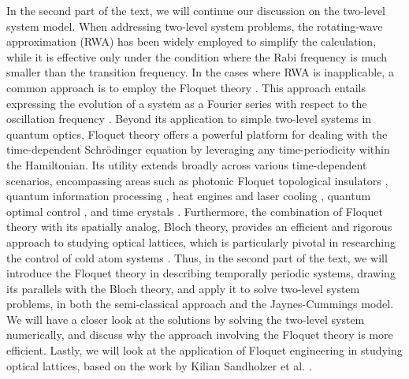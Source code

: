 \documentclass[reprint, amsmath, amssymb, aps]{revtex4-2}
\begin{document}
In the second part of the text, we will continue our discussion on the two-level system model.
When addressing two-level system problems, the rotating-wave approximation (RWA) has been widely employed to simplify the calculation, while it is effective only under the condition where the Rabi frequency is much smaller than the transition frequency. In the cases where RWA is inapplicable, a common approach is to employ the Floquet theory \cite{Shirley, Engelhardt, Wang}. This approach entails expressing the evolution of a system as a Fourier series with respect to the oscillation frequency \cite{Campaioli, Viebahn}. Beyond its application to simple two-level systems in quantum optics, Floquet theory offers a powerful platform for dealing with the time-dependent Schrödinger equation by leveraging any time-periodicity within the Hamiltonian. Its utility extends broadly across various time-dependent scenarios, encompassing areas such as photonic Floquet topological insulators \cite{Rechtsman}, quantum information processing \cite{88}, heat engines and laser cooling \cite{89}, quantum optimal control \cite{90,91}, and time crystals \cite{92,93}. Furthermore, the combination of Floquet theory with its spatially analog, Bloch theory, provides an efficient and rigorous approach to studying optical lattices, which is particularly pivotal in researching the control of cold atom systems \cite{Viebahn, Sandholzer, Anderson}. Thus, in the second part of the text, we will introduce the Floquet theory in describing temporally periodic systems, drawing its parallels with the Bloch theory, and apply it to solve two-level system problems, in both the semi-classical approach and the Jaynes-Cummings model. We will have a closer look at the solutions by solving the two-level system numerically, and discuss why the approach involving the Floquet theory is more efficient. Lastly, we will look at the application of Floquet engineering in studying optical lattices, based on the work by Kilian Sandholzer et al. \cite{Sandholzer}.
\end{document}
